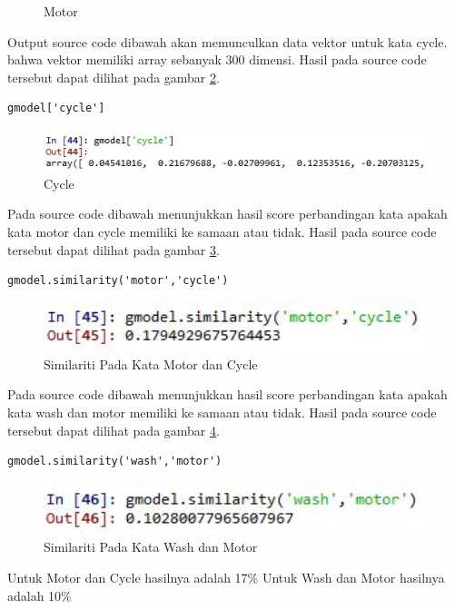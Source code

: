 \begin{enumerate}
\begin{figure}[ht]
	\caption{Motor}
	\label{c5_16}
\end{figure}
\subitem Output source code dibawah akan memunculkan data vektor untuk kata cycle. bahwa vektor memiliki array sebanyak 300 dimensi. Hasil pada source code tersebut dapat dilihat pada gambar \ref{c5_17}.
\begin{verbatim}
gmodel['cycle']
\end{verbatim}
\begin{figure}[ht]
	\centerline{\includegraphics[width=1\textwidth]{figures/huda/chapter5/17.JPG}}
	\caption{Cycle}
	\label{c5_17}
\end{figure}
\subitem Pada source code dibawah menunjukkan hasil score perbandingan kata apakah kata motor dan cycle memiliki ke samaan atau tidak.  Hasil pada source code tersebut dapat dilihat pada gambar \ref{c5_18}.
\begin{verbatim}
gmodel.similarity('motor','cycle')
\end{verbatim}
\begin{figure}[ht]
	\centerline{\includegraphics[width=1\textwidth]{figures/huda/chapter5/18.JPG}}
	\caption{Similariti Pada Kata Motor dan Cycle}
	\label{c5_18}
\end{figure}
\subitem Pada source code dibawah menunjukkan hasil score perbandingan kata apakah kata wash dan motor memiliki ke samaan atau tidak.  Hasil pada source code tersebut dapat dilihat pada gambar \ref{c5_19}.
\begin{verbatim}
gmodel.similarity('wash','motor')
\end{verbatim}
\begin{figure}[ht]
	\centerline{\includegraphics[width=1\textwidth]{figures/huda/chapter5/19.JPG}}
	\caption{Similariti Pada Kata Wash dan Motor}
	\label{c5_19}
\end{figure}
\subitem Untuk Motor dan Cycle hasilnya adalah 17\%
\subitem Untuk Wash dan Motor hasilnya adalah 10\%

\end{enumerate}
